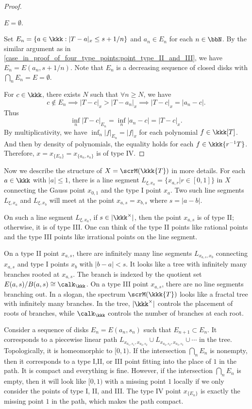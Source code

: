 \begin{proof}
	\begin{case}\label{case_in_proof_of_four_type_points:point_type_IV}
		\(E = \emptyset\).
	\end{case}

	Set \(E_n = \{a \in \kkk : |T - a|_x \leq s + 1/n\}\) and \(a_n \in E_n\) for each \(n \in \bbN\).
	By the similar argument as in \cref{case_in_proof_of_four_type_points:point_type_II_and_III}, we have \(E_n = E(a_n, s + 1/n)\).
	Note that \(E_n\) is a decreasing sequence of closed disks with \(\bigcap_n E_n = E = \emptyset\).

	For \(c \in \kkk\), there exists \(N\) such that \(\forall n \geq N\), we have
	\[ c \notin E_n \implies |T - c|_x > |T - a_n|_x \implies |T - c|_x = |a_n - c|. \]
	Thus
	\[ \inf_n |T-c|_{E_n} = \inf_n |a_n - c| = |T - c|_x. \]
	By multiplicativity, we have \(\inf_n |f|_{E_n} = |f|_x\) for each polynomial \(f \in \kkk[T]\).
	And then by density of polynomials, the equality holds for each \(f \in \kkk\{r^{-1}T\}\).
	Therefore, \(x = x_{\{E_n\}} = x_{\{a_n,s_n\}}\) is of type IV.
\end{proof}

Now we describe the structure of \(X = \scrM(\kkk\{T\})\) in more details.
For each \(a \in \kkk\) with \(|a| \leq 1\), there is a line segment \(L_{\xi,x_a}=\{x_{a,r}| r \in [0,1]\}\) in \(X\) connecting the Gauss point \(x_{0,1}\) and the type I point \(x_a\).
Two such line segments \(L_{\xi,x_a}\) and \(L_{\xi,x_b}\) will meet at the point \(x_{a,s}=x_{b,s}\) where \(s = |a - b|\).

On such a line segment \(L_{\xi,x_a}\), if \(s \in |\kkk^\times|\), then the point \(x_{a,s}\) is of type II; otherwise, it is of type III.
One can think of the type II points like rational points and the type III points like irrational points on the line segment.

On a type II point \(x_{a,s}\), there are infinitely many line segments \(L_{x_{a,s},x_b}\) connecting \(x_{a,s}\) and type I points \(x_b\) with \(|b - a| < s\).
It looks like a tree with infinitely many branches rooted at \(x_{a,s}\).
The branch is indexed by the quotient set \(E(a,s)/B(a,s) \cong \calk_\kkk\).
On a type III point \(x_{a,s}\), there are no line segments branching out.
In a slogan, the spectrum \(\scrM(\kkk\{T\})\) looks like a fractal tree with infinitely many branches.
In the tree, \(|\kkk^\times|\) controls the placement of roots of branches, while \(\calk_\kkk\) controls the number of branches at each root.

Consider a sequence of disks \(E_n = E(a_n,s_n)\) such that \(E_{n+1} \subset E_n\).
It corresponds to a piecewise linear path \(L_{x_{a_1,s_1}, x_{a_2,s_2}} \cup L_{x_{a_2,s_2}, x_{a_3,s_3}} \cup \cdots\) in the tree.
Topologically, it is homeomorphic to \([0,1)\).
If the intersection \(\bigcap_n E_n\) is nonempty, then it corresponds to a type I,II, or III point fitting into the place of \(1\) in the path.
It is compact and everything is fine.
However, if the intersection \(\bigcap_n E_n\) is empty, then it will look like \([0,1)\) with a missing point \(1\) locally if we only consider the points of type I, II, and III.
The type IV point \(x_{\{E_n\}}\) is exactly the missing point \(1\) in the path, which makes the path compact.

